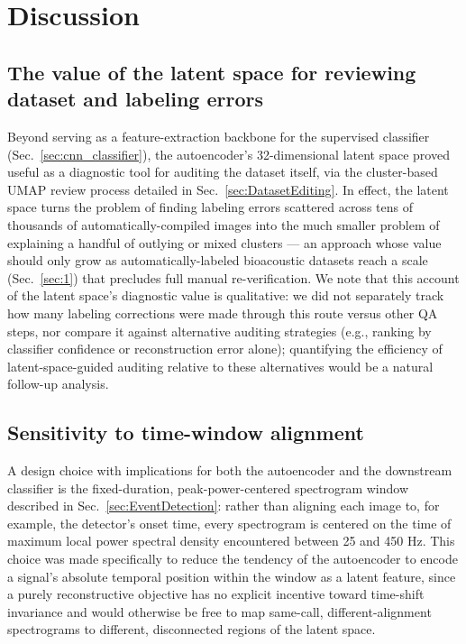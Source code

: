 \documentclass[preprint,NumberedRefs]{JASAnew}
\begin{document}

\section{Discussion}


\subsection{The value of the latent space for reviewing dataset and labeling errors}

Beyond serving as a feature-extraction backbone for the supervised classifier
(Sec.~\ref{sec:cnn_classifier}), the autoencoder's 32-dimensional latent space
proved useful as a diagnostic tool for auditing the dataset itself, via the
cluster-based UMAP review process detailed in Sec.~\ref{sec:DatasetEditing}.
In effect, the latent space turns
the problem of finding labeling errors scattered across tens of thousands of
automatically-compiled images into the much smaller problem of explaining a
handful of outlying or mixed clusters — an approach whose value should only
grow as automatically-labeled bioacoustic datasets reach a scale (Sec.~\ref{sec:1})
that precludes full manual re-verification. We note that this account of the
latent space's diagnostic value is qualitative: we did not separately track
how many labeling corrections were made through this route versus other QA
steps, nor compare it against alternative auditing strategies (e.g., ranking
by classifier confidence or reconstruction error alone); quantifying the
efficiency of latent-space-guided auditing relative to these alternatives
would be a natural follow-up analysis.

\subsection{Sensitivity to time-window alignment}

A design choice with implications for both the autoencoder and the
downstream classifier is the fixed-duration, peak-power-centered spectrogram
window described in Sec.~\ref{sec:EventDetection}: rather than aligning each
image to, for example, the detector's onset time, every spectrogram is
centered on the time of maximum local power spectral density encountered
between 25 and 450 Hz. This choice was made specifically to reduce the
tendency of the autoencoder to encode a signal's absolute temporal position
within the window as a latent feature, since a purely reconstructive
objective has no explicit incentive toward time-shift invariance and would
otherwise be free to map same-call, different-alignment spectrograms to
different, disconnected regions of the latent space.
\end{document}
